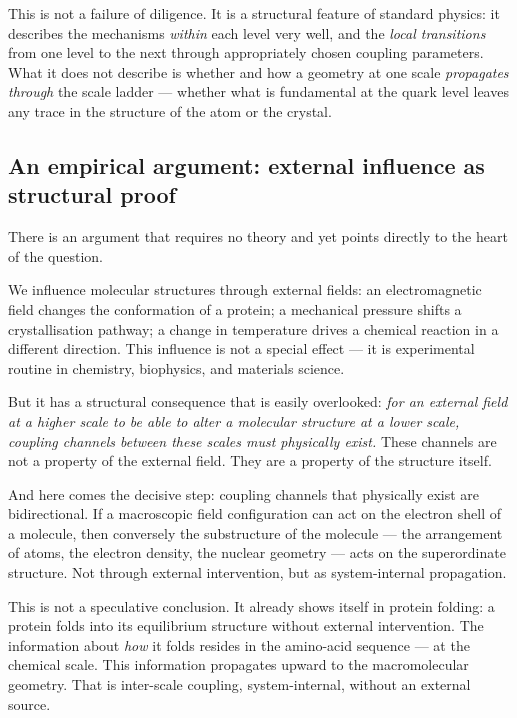 This is not a failure of diligence. It is a structural feature of
standard physics: it describes the mechanisms \emph{within} each
level very well, and the \emph{local transitions} from one level to
the next through appropriately chosen coupling parameters. What it
does not describe is whether and how a geometry at one scale
\emph{propagates through} the scale ladder --- whether what is
fundamental at the quark level leaves any trace in the structure of
the atom or the crystal.

\subsection*{An empirical argument: external influence as structural proof}

There is an argument that requires no theory and yet points directly
to the heart of the question.

We influence molecular structures through external fields: an
electromagnetic field changes the conformation of a protein; a
mechanical pressure shifts a crystallisation pathway; a change in
temperature drives a chemical reaction in a different direction. This
influence is not a special effect --- it is experimental routine in
chemistry, biophysics, and materials science.

But it has a structural consequence that is easily overlooked:
\emph{for an external field at a higher scale to be able to alter a
molecular structure at a lower scale, coupling channels between these
scales must physically exist.} These channels are not a property of
the external field. They are a property of the structure itself.

And here comes the decisive step: coupling channels that physically
exist are bidirectional. If a macroscopic field configuration can act
on the electron shell of a molecule, then conversely the substructure
of the molecule --- the arrangement of atoms, the electron density,
the nuclear geometry --- acts on the superordinate structure. Not
through external intervention, but as system-internal propagation.

This is not a speculative conclusion. It already shows itself in
protein folding: a protein folds into its equilibrium structure
without external intervention. The information about \emph{how} it
folds resides in the amino-acid sequence --- at the chemical scale.
This information propagates upward to the macromolecular geometry.
That is inter-scale coupling, system-internal, without an external
source.

